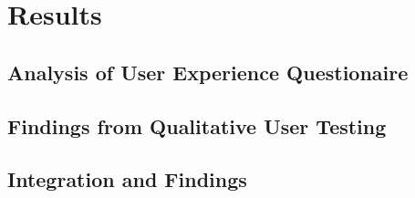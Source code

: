 %
\chapter{Results}
\label{sec:result}


\section{Analysis of User Experience Questionaire}
\label{sec:result:ux}


\section{Findings from Qualitative User Testing}
\label{sec:result:testing}


\section{Integration and Findings}
\label{sec:result:findings}

